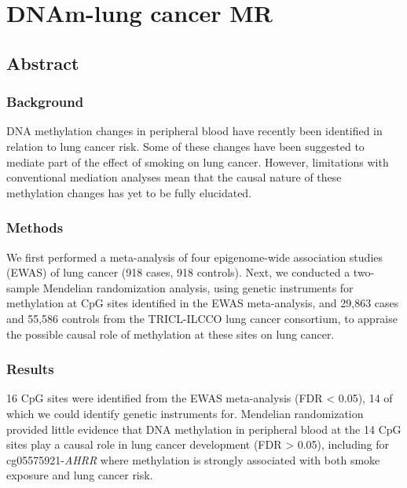 \documentclass[11pt,twoside]{bristolthesis}
\begin{document}
\hypertarget{dnam-lung-cancer-mr}{%
\chapter{DNAm-lung cancer MR}\label{dnam-lung-cancer-mr}}

\hypertarget{abstract-1}{%
\section{Abstract}\label{abstract-1}}

\hypertarget{background}{%
\subsection{Background}\label{background}}

DNA methylation changes in peripheral blood have recently been identified in relation to lung cancer risk. Some of these changes have been suggested to mediate part of the effect of smoking on lung cancer. However, limitations with conventional mediation analyses mean that the causal nature of these methylation changes has yet to be fully elucidated.

\hypertarget{methods-2}{%
\subsection{Methods}\label{methods-2}}

We first performed a meta-analysis of four epigenome-wide association studies (EWAS) of lung cancer (918 cases, 918 controls). Next, we conducted a two-sample Mendelian randomization analysis, using genetic instruments for methylation at CpG sites identified in the EWAS meta-analysis, and 29,863 cases and 55,586 controls from the TRICL-ILCCO lung cancer consortium, to appraise the possible causal role of methylation at these sites on lung cancer.

\hypertarget{results-1}{%
\subsection{Results}\label{results-1}}

16 CpG sites were identified from the EWAS meta-analysis (FDR \textless{} 0.05), 14 of which we could identify genetic instruments for. Mendelian randomization provided little evidence that DNA methylation in peripheral blood at the 14 CpG sites play a causal role in lung cancer development (FDR \textgreater{} 0.05), including for cg05575921-\emph{AHRR} where methylation is strongly associated with both smoke exposure and lung cancer risk.
\end{document}
